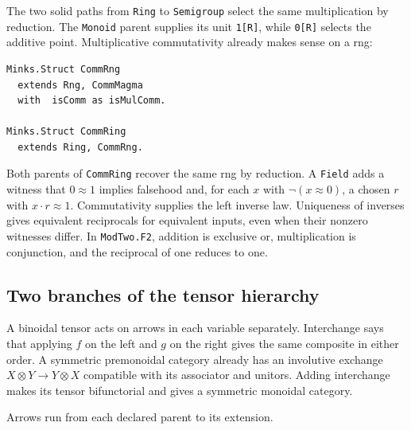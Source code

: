 \documentclass{article}
\newcommand{\ttt}[1]{\texttt{#1}}
\begin{document}
The two solid paths from \ttt{Ring} to \ttt{Semigroup} select the same
multiplication by reduction. The \ttt{Monoid} parent supplies its unit
\ttt{1[R]}, while \ttt{0[R]} selects the additive point.
Multiplicative commutativity already makes sense on a rng:
\begin{verbatim}
Minks.Struct CommRng
  extends Rng, CommMagma
  with  isComm as isMulComm.

Minks.Struct CommRing
  extends Ring, CommRng.
\end{verbatim}
Both parents of \ttt{CommRing} recover the same rng by reduction.
A \ttt{Field} adds a witness that $0\approx 1$ implies falsehood
and, for each $x$ with $\neg(x\approx 0)$, a chosen $r$ with
$x\cdot r\approx 1$. Commutativity supplies the left inverse law.
Uniqueness of inverses gives equivalent reciprocals for equivalent
inputs, even when their nonzero witnesses differ.
In \ttt{ModTwo.F2}, addition is exclusive or, multiplication is
conjunction, and the reciprocal of one reduces to one.

\clearpage
\subsection{Two branches of the tensor hierarchy}
A binoidal tensor acts on arrows in each variable separately. Interchange
says that applying $f$ on the left and $g$ on the right gives the same
composite in either order. A symmetric premonoidal category already has
an involutive exchange $X\otimes Y\to Y\otimes X$ compatible with its
associator and unitors. Adding interchange makes its tensor bifunctorial
and gives a symmetric monoidal category.

\begin{center}

\small Arrows run from each declared parent to its extension.
\end{center}
\end{document}
